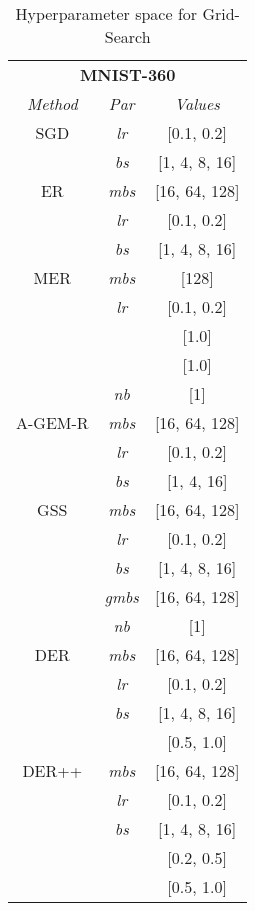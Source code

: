 \documentclass{article}
\begin{document}
{\begin{table}[H]
\begin{multicols}{3}
\begin{tabular}{ccc}
\toprule
\multicolumn{3}{c}{\textbf{MNIST-360}}\\
\textit{Method}  & \textit{Par} &
\textit{Values} \\
\midrule
SGD   & \textit{lr} & [0.1, 0.2] \\
& 	  \textit{bs} & [1, 4, 8, 16] \\
\midrule
ER  & \textit{mbs} & [16, 64, 128] \\
& 	  \textit{lr} & [0.1, 0.2] \\
& 	  \textit{bs} & [1, 4, 8, 16] \\
\midrule
MER   & \textit{mbs} & [128] \\
& 	  \textit{lr} & [0.1, 0.2] \\
& 	  \textit{} & [1.0] \\
& 	  \textit{} & [1.0] \\
& 	  \textit{nb} & [1] \\
\midrule
A-GEM-R  & \textit{mbs} & [16, 64, 128] \\
& 	  \textit{lr} & [0.1, 0.2] \\
& 	  \textit{bs} & [1, 4, 16] \\
\midrule
GSS   & \textit{mbs} & [16, 64, 128] \\
& 	  \textit{lr} & [0.1, 0.2] \\
& 	  \textit{bs} & [1, 4, 8, 16] \\
& 	  \textit{gmbs} & [16, 64, 128] \\
&     \textit{nb} & [1] \\
\midrule
DER   & \textit{mbs} & [16, 64, 128] \\
& 	  \textit{lr} & [0.1, 0.2] \\
& 	  \textit{bs} & [1, 4, 8, 16] \\
& 	  \textit{} & [0.5, 1.0] \\
\midrule
DER++ & \textit{mbs} & [16, 64, 128] \\
& 	  \textit{lr} & [0.1, 0.2] \\
& 	  \textit{bs} & [1, 4, 8, 16] \\
& 	  \textit{} & [0.2, 0.5] \\
& 	  \textit{} & [0.5, 1.0] \\
\bottomrule
\end{tabular}
     \end{multicols}
\caption{Hyperparameter space for Grid-Search}
    \label{tab:hyperparam_space}
\end{table}
}\clearpage{}
\end{document}
